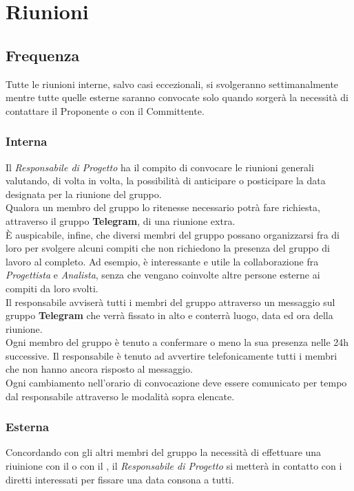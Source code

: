 \section{Riunioni}
  \subsection{Frequenza}
    Tutte le riunioni interne, salvo casi eccezionali, si svolgeranno settimanalmente mentre tutte quelle esterne saranno convocate solo quando sorgerà la necessità di contattare il Proponente o con il Committente.
    
    \subsubsection{Interna}
      Il \emph{Responsabile di Progetto} ha il compito di convocare le riunioni generali valutando, di volta in volta, la possibilità di anticipare o posticipare la data
      designata per la riunione del gruppo.\\
      Qualora un membro del gruppo lo ritenesse necessario potrà fare richiesta, attraverso il gruppo \textbf{Telegram}, di una riunione extra.\\
      È auspicabile, infine, che diversi membri del gruppo possano organizzarsi fra di loro per svolgere alcuni compiti che non richiedono la presenza  del gruppo di lavoro
      al completo. Ad esempio, è interessante e utile la collaborazione fra \emph{Progettista} e \emph{Analista}, senza che vengano coinvolte altre persone esterne ai compiti
      da loro svolti.\\
      Il responsabile avviserà tutti i membri del gruppo attraverso un messaggio sul gruppo \textbf{Telegram} che verrà fissato in alto e conterrà luogo, data ed ora della riunione.\\
      Ogni membro del gruppo è tenuto a confermare o meno la sua presenza nelle 24h successive. Il responsabile è tenuto ad avvertire telefonicamente tutti i membri che
      non hanno ancora risposto al messaggio.\\
      Ogni cambiamento nell'orario di convocazione deve essere comunicato per tempo dal responsabile attraverso le modalità sopra elencate.
    \subsubsection{Esterna}
      Concordando con gli altri membri del gruppo la necessità di effettuare una riuinione con il  o con il , il \emph{Responsabile di Progetto}
      si metterà in contatto con i diretti interessati per fissare una data consona a tutti.
